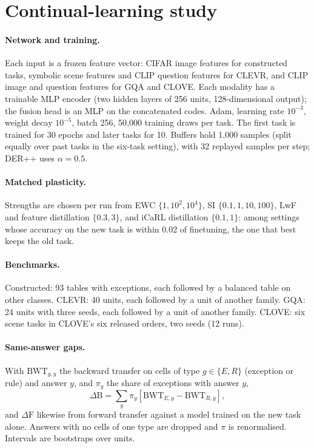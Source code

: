 \section{Continual-learning study}
\label{sup:cl}

\paragraph{Network and training.}
Each input is a frozen feature vector: CIFAR image features for constructed tasks, symbolic
scene features and CLIP question features for CLEVR, and CLIP image and question features for
GQA and CLOVE. Each modality has a trainable MLP encoder (two hidden layers of 256 units,
128-dimensional output); the fusion head is an MLP on the concatenated codes. Adam, learning rate
$10^{-3}$, weight decay $10^{-5}$, batch 256, 50{,}000 training draws per task. The first task
is trained for 30 epochs and later tasks for 10. Buffers hold 1{,}000 samples (split equally
over past tasks in the six-task setting), with 32 replayed samples per step; DER++ uses
$\alpha=0.5$.

\paragraph{Matched plasticity.}
Strengths are chosen per run from EWC $\{1,10^2,10^4\}$, SI $\{0.1,1,10,100\}$, LwF and
feature distillation $\{0.3,3\}$, and iCaRL distillation $\{0.1,1\}$: among settings whose
accuracy on the new task is within 0.02 of finetuning, the one that best keeps the old task.

\paragraph{Benchmarks.}
Constructed: 93 tables with exceptions, each followed by a balanced table on other classes.
CLEVR: 40 units, each followed by a unit of another family. GQA: 24 units with three seeds,
each followed by a unit of another family. CLOVE: six scene tasks in CLOVE's six released
orders, two seeds (12 runs).

\paragraph{Same-answer gaps.}
With $\mathrm{BWT}_{g,y}$ the backward transfer on cells of type $g\in\{E,R\}$ (exception or
rule) and answer $y$, and $\pi_y$ the share of exceptions with answer $y$,
\begin{equation}
  \Delta\mathrm{B}=\sum_{y}\pi_y\left[\mathrm{BWT}_{E,y}-\mathrm{BWT}_{R,y}\right],
\end{equation}
and $\Delta\mathrm{F}$ likewise from forward transfer against a model trained on the new task
alone. Answers with no cells of one type are dropped and $\pi$ is renormalised. Intervals are
bootstraps over units.

